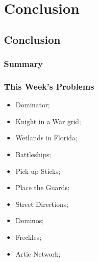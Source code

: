 \documentclass{beamer}
\begin{document}




\section{Conclusion}
\subsection{Conclusion}
\begin{frame}
  \frametitle{Summary}
\end{frame}

\begin{frame}
  \frametitle{This Week's Problems}
  \begin{itemize}
  \item Dominator;
  \item Knight in a War grid;
  \item Wetlands in Florida;
  \item Battleships;
  \item Pick up Sticks;
  \item Place the Guards;
  \item Street Directions;
  \item Dominos;
  \item Freckles;
  \item Artic Network;
  \end{itemize}
\end{frame}
\end{document}
